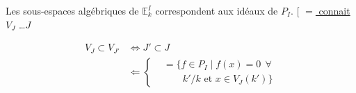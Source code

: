 Les  sous-espaces algébriques de $\mathbb E_k^I$ correspondent aux idéaux de $P_I$.  $\bigl[$ \uline{ $=$ connait} $V_J$ \ldots {}$J$

\[
\begin{aligned}
V_J\subset V_{J'}&\Longleftrightarrow J'\subset J\\[-2pt]
&\Leftarrow\left\{\begin{aligned}&=\{f\in P_I\mid f(x)=0\ \ \forall\\&\qquad k'/k\text{ et }x\in V_J(k')\}\end{aligned}\right.
\end{aligned}
\]

